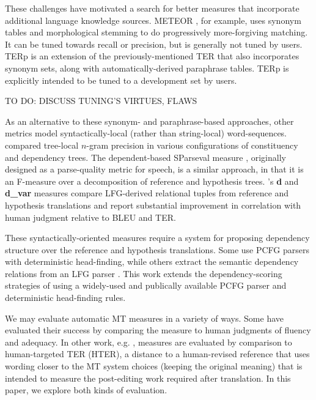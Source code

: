 \documentclass{kluwer}    %
\begin{document}
\begin{article}
These challenges have motivated a search for better measures that
incorporate additional language knowledge sources.  METEOR
\cite{banerjee05meteor}, for example, uses synonym tables and
morphological stemming to do progressively more-forgiving matching.
It can be tuned towards recall or precision, but is generally not
tuned by users.  TERp \cite{snover09terp} is an extension of the
previously-mentioned TER that also incorporates synonym sets, along
with automatically-derived paraphrase tables.  TERp is explicitly
intended to be tuned to a development set by users.

TO DO: DISCUSS TUNING'S VIRTUES, FLAWS

As an alternative to these synonym- and paraphrase-based approaches,
other metrics model syntactically-local (rather than string-local)
word-sequences. \cite{liu05syntaxformteval} compared tree-local
$n$-gram precision in various configurations of constituency and
dependency trees.  The dependent-based SParseval measure
\cite{roark06:sparseval}, originally designed as a parse-quality
metric for speech, is a similar approach, in that it is an F-measure
over a decomposition of reference and hypothesis trees.
\cite{owczarzak07labelleddepseval}'s \textbf{d} and \textbf{d\_var}
measures compare LFG-derived relational tuples from reference and
hypothesis translations and report substantial improvement in
correlation with human judgment relative to BLEU and TER.

These syntactically-oriented measures require a system for proposing
dependency structure over the reference and hypothesis
translations. Some \cite{liu05syntaxformteval,roark06:sparseval} use
PCFG parsers with deterministic head-finding, while others
\cite{owczarzak07labelleddepseval}extract the semantic dependency
relations from an LFG parser \cite{cahill04lfg}.
%
This work extends the dependency-scoring strategies of
\cite{roark06:sparseval,owczarzak07labelleddepseval} using a
widely-used and publically available PCFG parser and deterministic
head-finding rules.
 
We may evaluate automatic MT measures in a variety of ways. Some
\cite{banerjee05meteor,liu05syntaxformteval,owczarzak07labelleddepseval}
have evaluated their success by comparing the measure to human
judgments of fluency and adequacy.  In other work,
e.g. \cite{snover06ter}, measures are evaluated by comparison to
human-targeted TER (HTER), a distance to a human-revised reference
that uses wording closer to the MT system choices (keeping the
original meaning) that is intended to measure the post-editing work
required after translation.  In this paper, we explore both kinds of
evaluation.


\end{article}
\end{document}
